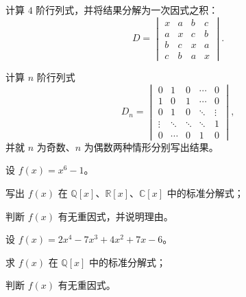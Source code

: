 \documentclass[11pt,a4paper,fontset=windows]{ctexart}
\begin{document}
\begin{qs}
\item 计算 $4$ 阶行列式，并将结果分解为一次因式之积：
\[
D=\begin{vmatrix}
x&a&b&c\\
a&x&c&b\\
b&c&x&a\\
c&b&a&x
\end{vmatrix}.
\]

\item 计算 $n$ 阶行列式
\[
D_n=\begin{vmatrix}
0&1&0&\cdots&0\\
1&0&1&\cdots&0\\
0&1&0&\ddots&\vdots\\
\vdots&\ddots&\ddots&\ddots&1\\
0&\cdots&0&1&0
\end{vmatrix},
\]
并就 $n$ 为奇数、$n$ 为偶数两种情形分别写出结果。

\item 设 $f(x)=x^{6}-1$。
\begin{sub}
\item 写出 $f(x)$ 在 $\mathbb{Q}[x]$、$\mathbb{R}[x]$、$\mathbb{C}[x]$ 中的标准分解式；
\item 判断 $f(x)$ 有无重因式，并说明理由。
\end{sub}

\item 设 $f(x)=2x^{4}-7x^{3}+4x^{2}+7x-6$。
\begin{sub}
\item 求 $f(x)$ 在 $\mathbb{Q}[x]$ 中的标准分解式；
\item 判断 $f(x)$ 有无重因式。
\end{sub}
\end{qs}
\end{document}

